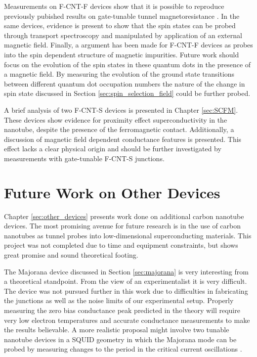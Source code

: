 Measurements on F-CNT-F devices show that it is possible to reproduce previously pubished results on gate-tunable tunnel magnetoresistance \cite{Sahoo2005, Aurich2010}. In the same devices, evidence is present to show that the spin states can be probed through transport spectroscopy and manipulated by application of an external magnetic field. Finally, a argument has been made for F-CNT-F devices as probes into the spin dependent structure of magnetic impurities. Future work should focus on the evolution of the spin states in these quantum dots in the presence of a magnetic field. By measuring the evolution of the ground state transitions between different quantum dot occupation numbers the nature of the change in spin state discussed in Section \ref{sec:spin_selection_field} could be further probed.

A brief analysis of two F-CNT-S devices is presented in Chapter \ref{sec:SCFM}. These devices show evidence for proximity effect superconductivity in the nanotube, despite the presence of the ferromagnetic contact. Additionally, a discussion of magnetic field dependent conductance features is presented. This effect lacks a clear physical origin and should be further investigated by measurements with gate-tunable F-CNT-S junctions.

\section{Future Work on Other Devices}

Chapter \ref{sec:other_devices} presents work done on additional carbon nanotube devices. The most promising avenue for future research is in the use of carbon nanotubes as tunnel probes into low-dimensional superconducting materials. This project was not completed due to time and equipment constraints, but shows great promise and sound theoretical footing. 

The Majorana device discussed in Section \ref{sec:majorana} is very interesting from a theoretical standpoint. From the view of an experimentalist it is very difficult. The device was not pursued further in this work due to difficulties in fabricating the junctions as well as the noise limits of our experimental setup. Properly measuring the zero bias conductance peak predicted in the theory will require very low electron temperatures and accurate conductance measurements to make the results believable. A more realistic proposal might involve two tunable nanotube devices in a SQUID geometry in which the Majorana mode can be probed by measuring changes to the period in the critical current oscillations \cite{Wang2015}. 